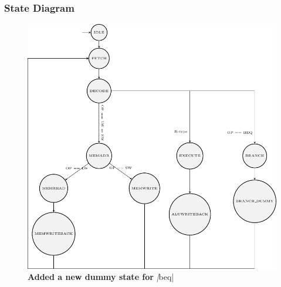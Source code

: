 \documentclass{article}
\begin{document}
\subsubsection*{State Diagram}
\begin{figure}[H]
    \begin{center}
        \includegraphics[scale=1]{MultiCycleImplementation/TexFiles/SD1.pdf}
        \caption*{\textbf{Added a new dummy state for }\textit|beq|}
    \end{center}
\end{figure}
\end{document}
